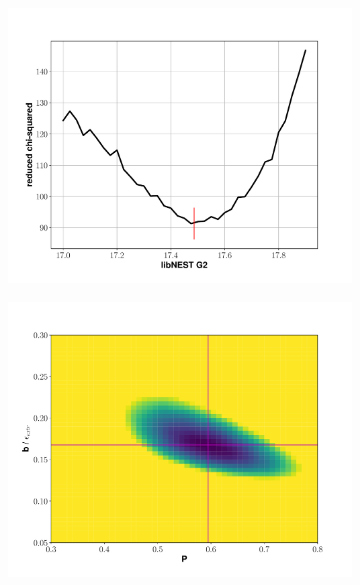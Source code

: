 \begin{figure}[h!]
\begin{subfigure}{0.5\textwidth}
  \includegraphics[width=\textwidth]{Figures/S2tail_g2fit_dcm.pdf}
\end{subfigure}%
\begin{subfigure}{0.5\textwidth}
  \centering
  \includegraphics[width=\textwidth]{Figures/S2tail_heatmap_dcm.pdf}
\end{subfigure}
\begin{subfigure}{0.5\textwidth}
  \centering

\end{subfigure}
\end{figure}
